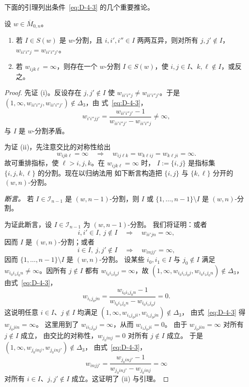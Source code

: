 下面的引理列出条件~\eqref{eq:D-4-3} 的几个重要推论。
\begin{lemma}\label{lem:D-4-4}
设 $w\in\overline M_{0,n}$。
\begin{enumerate}
\item[(i)] 若 $I\in S(w)$ 是 $w$-分割，且 $i,i',i''\in I$
两两互异，则对所有 $j,j'\notin I$，
$w_{ii'i''j}=w_{ii'i''j'}$。
\item[(ii)] 若 $w_{ijk\ell}=\infty$，则存在一个 $w$-分割
$I\in S(w)$，使 $i,j\in I$、$k,\ell\notin I$，或反之。
\end{enumerate}
\end{lemma}
\begin{proof}
先证 (i)。反设存在 $j,j'\notin I$ 使
$w_{ii'i''j}\ne w_{ii'i''j'}$。于是
$(1,\infty,w_{ii'i''j},w_{ii'i''j'})\notin\Delta_3$，由
式~\eqref{eq:D-4-3}，
\[
  w_{i'i''jj'}=
  \frac{w_{ii'i''j'}-1}{w_{ii'i''j'}-w_{ii'i''j}}
  \ne\infty,
\]
与 $I$ 是 $w$-分割矛盾。

为证 (ii)，先注意交比的对称性给出
\[
  w_{ijk\ell}=\infty\quad\Longrightarrow\quad
  w_{ij\ell k}=w_{k\ell ij}=w_{k\ell ji}=\infty.
\]
故可重排指标，使 $\ell>i,j,k$。在 $w_{ijk\ell}=\infty$ 时，
$I:=\{i,j\}$ 是指标集 $\{i,j,k,\ell\}$ 的分割。现在以归纳法用
如下断言构造把 $\{i,j\}$ 与 $\{k,\ell\}$ 分开的 $(w,n)$-分割。

\emph{断言。} 若 $I\in\mathcal I_{n-1}$ 是 $(w,n-1)$-分割，则
$I$ 或 $\{1,\ldots,n-1\}\setminus I$ 是 $(w,n)$-分割。

为证此断言，设 $I\in\mathcal I_{n-1}$ 为 $(w,n-1)$-分割。
我们将证明：或者
\[
  i,i'\in I,\ j\notin I\quad\Longrightarrow\quad
  w_{ii'jn}=\infty,
\]
因而 $I$ 是 $(w,n)$-分割；或者
\[
  i\in I,\ j,j'\notin I\quad\Longrightarrow\quad
  w_{injj'}=\infty,
\]
因而 $\{1,\ldots,n-1\}\setminus I$ 是 $(w,n)$-分割。
设某些 $i_0,i_1\in I$ 与 $j_0\notin I$ 满足
$w_{i_0i_1j_0n}\ne\infty$。因所有 $j\notin I$ 都有
$w_{i_0i_1j_0j}=\infty$，故
$(1,\infty,w_{i_0i_1j_0j},w_{i_0i_1j_0n})\notin\Delta_3$，
由式~\eqref{eq:D-4-3}，
\[
  w_{i_1j_0jn}=
  \frac{w_{i_0i_1j_0n}-1}{w_{i_0i_1j_0n}-w_{i_0i_1j_0j}}
  =0.
\]
这说明任意 $i\in I$、$j\notin I$ 均满足
$(1,\infty,w_{i_1j_0ji},w_{i_1j_0jn})\notin\Delta_3$，
由式~\eqref{eq:D-4-3} 得 $w_{j_0jin}=\infty$。
这里用到了 $w_{ii_1j_0j}=\infty$，从而 $w_{i_1j_0ji}=0$。
由于 $w_{j_0jin}=\infty$ 对所有 $j\notin I$ 成立，
由交比的对称性，$w_{j_0inj}=0$ 对所有 $j\notin I$ 成立。
于是
$(1,\infty,w_{j_0inj},w_{j_0inj'})\notin\Delta_3$，
由式~\eqref{eq:D-4-3}，
\[
  w_{injj'}=
  \frac{w_{j_0inj'}-1}{w_{j_0inj'}-w_{j_0inj}}=\infty
\]
对所有 $i\in I$、$j,j'\notin I$ 成立。这证明了 (ii) 与引理。
\end{proof}

